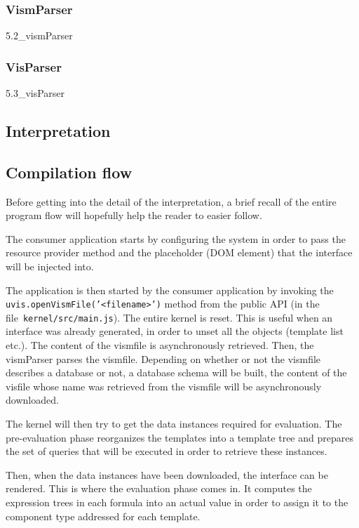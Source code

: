 

\subsubsection{VismParser}
\label{sec:vismParser}
{5.2_vismParser}

\subsubsection{VisParser}
\label{sec:visParser}
{5.3_visParser}

\subsection{Interpretation}

\subsection{Compilation flow}

Before getting into the detail of the interpretation, a brief recall of the entire program flow will hopefully help the reader to easier follow.

The consumer application starts by configuring the system in order to pass the resource provider method and the placeholder (DOM element) that the interface will be injected into.

The application is then started by the consumer application by invoking the \texttt{uvis.openVismFile('<filename>')} method from the public API (in the file~\texttt{kernel/src/main.js}). The entire kernel is reset. This is useful when an interface was already generated, in order to unset all the objects (template list etc.). The content of the vismfile is asynchronously retrieved. Then, the vismParser parses the vismfile. Depending on whether or not the vismfile describes a database or not, a database schema will be built, the content of the visfile whose name was retrieved from the vismfile will be asynchronously downloaded.

The kernel will then try to get the data instances required for evaluation. The pre-evaluation phase reorganizes the templates into a template tree and prepares the set of queries that will be executed in order to retrieve these instances.

Then, when the data instances have been downloaded, the interface can be rendered. This is where the evaluation phase comes in. It computes the expression trees in each formula into an actual value in order to assign it to the component type addressed for each template.

